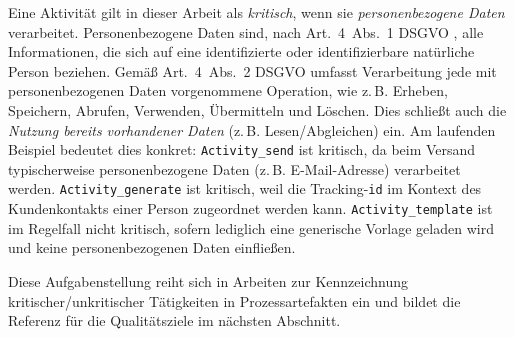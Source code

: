 Eine Aktivität gilt in dieser Arbeit als \emph{kritisch}, wenn sie \emph{personenbezogene Daten} verarbeitet. Personenbezogene Daten sind, nach Art.~4~Abs.~1 \ac{DSGVO} \cite{GDPR2016}, alle Informationen, die sich auf eine identifizierte oder identifizierbare natürliche Person beziehen. Gemäß Art.~4~Abs.~2 \ac{DSGVO} \cite{GDPR2016} umfasst Verarbeitung jede mit personenbezogenen Daten vorgenommene Operation, wie z.\,B. Erheben, Speichern, Abrufen, Verwenden, Übermitteln und Löschen. Dies schließt auch die \emph{Nutzung bereits vorhandener Daten} (z.\,B. Lesen/Abgleichen) ein. Am laufenden Beispiel bedeutet dies konkret: \texttt{Activity\_send} ist kritisch, da beim Versand typischerweise personenbezogene Daten (z.\,B. E-Mail-Adresse) verarbeitet werden. \texttt{Activity\_generate} ist kritisch, weil die Tracking-\texttt{id} im Kontext des Kundenkontakts einer Person zugeordnet werden kann. \texttt{Activity\_template} ist im Regelfall nicht kritisch, sofern lediglich eine generische Vorlage geladen wird und keine personenbezogenen Daten einfließen.

Diese Aufgabenstellung reiht sich in Arbeiten zur Kennzeichnung kritischer/unkritischer Tätigkeiten in Prozessartefakten ein und bildet die Referenz für die Qualitätsziele im nächsten Abschnitt. \cite{nake2023towards}